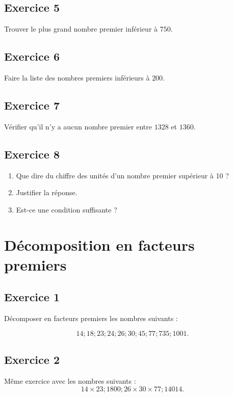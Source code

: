 \documentclass[12 pt]{article}
\theoremstyle{plain}
\newcounter{n}
\numberwithin{n}{section}
\begin{document}
\subsection*{Exercice 5}

Trouver le plus grand nombre premier inférieur à $750$. 

\subsection*{Exercice 6}

Faire la liste des nombres premiers inférieurs à $200$.

\subsection*{Exercice 7}

Vérifier qu'il n'y a aucun nombre premier entre $1328$ et $1360$.

\subsection*{Exercice 8}

\begin{enumerate}
\item Que dire du chiffre des unités d'un nombre premier supérieur à 10 ?
\item
Justifier la réponse. \item Est-ce une condition suffisante ? \end{enumerate}

\section*{Décomposition en facteurs premiers}
\subsection*{Exercice 1}

Décomposer en facteurs premiers les nombres suivants : 

\[ 14 ; 18 ; 23 ; 24 ; 26 ; 30 ; 45 ; 77 ; 735 ; 1 001. \]

\subsection*{Exercice 2}

Même exercice avec les nombres suivants : \[
14\times 23 ; 1800 ; 26 \times 30 \times 77 ; 14 014.\]
\end{document}
